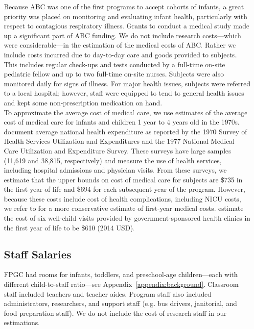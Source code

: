 \noindent Because ABC was one of the first programs to accept cohorts of infants, a great priority was placed on monitoring and evaluating infant health, particularly with respect to contagious respiratory illness. Grants to conduct a medical study made up a significant part of ABC funding. We do not include research costs---which were considerable---in the estimation of the medical costs of ABC. Rather we include costs incurred due to day-to-day care and goods provided to subjects. This includes regular check-ups and tests conducted  by a full-time on-site pediatric fellow and up to two full-time on-site nurses. Subjects were also monitored daily for signs of illness. For major health issues, subjects were referred to a local hospital; however, staff were equipped to tend to general health issues and kept some non-prescription medication on hand. \\

\noindent To approximate the average cost of medical care, we use  estimates of the average cost of medical care for infants and children 1 year to 4 years old in the 1970s. \cite{Cutler_Meara_1998_Med-Costs_BOOK} document average national health expenditure as reported by  the 1970 Survey of Health Services  Utilization  and Expenditures and the 1977 National Medical Care Utilization  and Expenditure Survey. These surveys have large samples (11,619 and 38,815, respectively) and measure the use of health services, including hospital admissions and physician visits. From these surveys, we estimate that the upper bounds on cost of medical care for subjects are \$735 in the first year of life and \$694 for each subsequent year of the program. However, because these costs include cost of health complications, including NICU costs, we refer to \cite{Robinson_etal_1974_FPP} for a more conservative estimate of first-year medical costs. \cite{Robinson_etal_1974_FPP} estimate the cost of six well-child visits provided by government-sponsored health clinics in the first year of life to be \$610 (2014 USD). \\

\subsection{Staff Salaries}
\noindent FPGC had rooms for infants, toddlers, and preschool-age children---each with different child-to-staff ratio---see Appendix~\ref{appendix:background}. Classroom staff included teachers and teacher aides. Program staff also included administrators, researchers, and support staff (e.g. bus drivers, janitorial, and food preparation staff). We do not include the cost of research staff in our estimations. \\

